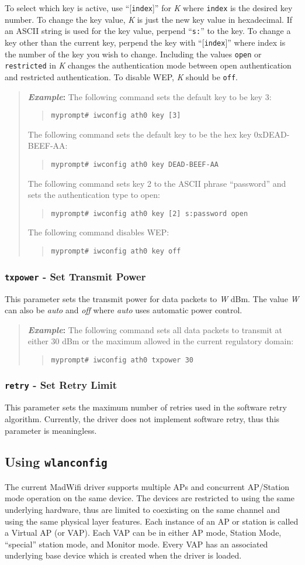 \documentclass[10pt,fullpage]{article}
\newcommand{\mytt}[1]{{\texttt{#1}}}
\newcommand{\bv}{\begin{verse}}
\newcommand{\ev}{\end{verse}}
\newcommand{\cmd}[1]{{\texttt{myprompt\# #1}}}
\newcommand{\clival}[1]{{\emph{#1}}}
\newenvironment{example}{\begin{quote}\textbf{\textit{Example}:}}{\end{quote}}
\begin{document}
To select which key is active, use ``[\mytt{index}]'' for \clival{K}
where \mytt{index} is the desired key number.  To change the key
value, \clival{K} is just the new key value in hexadecimal.  If an
ASCII string is used for the key value, perpend ``\mytt{s:}'' to the
key.  To change a key other than the current key, perpend the key with
``[\mytt{index}]'' where index is the number of the key you wish to
change.  Including the values \mytt{open} or \mytt{restricted} in
\clival{K} changes the authentication mode between open authentication
and restricted authentication.  To disable WEP, \clival{K} should be \mytt{off}.
\begin{example}
  The following command sets the default key to be key 3:
  \bv
  \cmd{iwconfig ath0 key [3]}
  \ev
  The following command sets the default key to be the hex key
  0xDEAD-BEEF-AA:
  \bv
  \cmd{iwconfig ath0 key DEAD-BEEF-AA}
  \ev
  The following command sets key 2 to the ASCII phrase ``password''
  and sets the authentication type to open:
  \bv
  \cmd{iwconfig ath0 key [2] s:password open}
  \ev
  The following command disables WEP:
  \bv
  \cmd{iwconfig ath0 key off}
  \ev
\end{example}

\subsubsection{\mytt{txpower} - Set Transmit Power}
This parameter sets the transmit power for data packets to \clival{W}
dBm.  The value \clival{W} can also be \clival{auto} and \clival{off}
where \clival{auto} uses automatic power control.
\begin{example}
  The following command sets all data packets to transmit at either 30
  dBm or the maximum allowed in the current regulatory domain:
  \bv
  \cmd{iwconfig ath0 txpower 30}
  \ev
\end{example}

\subsubsection{\mytt{retry} - Set Retry Limit}
This parameter sets the maximum number of retries used in the software
retry algorithm.  Currently, the driver does not implement software
retry, thus this parameter is meaningless.

\subsection{Using \mytt{wlanconfig}}
\label{sec:wlanconfig}
The current MadWifi driver supports multiple APs and concurrent
AP/Station mode operation on the same device.  The devices are
restricted to using the same underlying hardware, thus are limited to
coexisting on the same channel and using the same physical layer
features.  Each instance of an AP or station is called a Virtual AP
(or VAP). Each VAP can be in either AP mode, Station Mode, ``special''
station mode, and Monitor mode.  Every VAP has an associated
underlying base device which is created when the driver is loaded.
\end{document}
